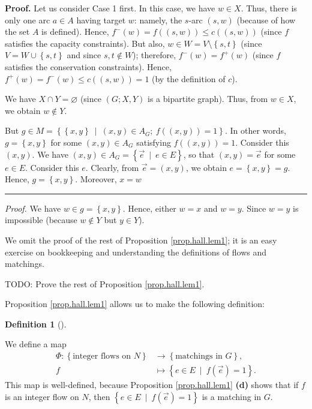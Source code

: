 \documentclass[numbers=enddot,12pt,final,onecolumn,notitlepage]{scrartcl}%
\newcounter{exer}
\theoremstyle{definition}
\newtheorem{defi}[theo]{Definition}
\newenvironment{definition}[1][]
{\begin{defi}[#1]\begin{leftbar}}
{\end{leftbar}\end{defi}}
\newenvironment{proof}[1][Proof]{\noindent\textbf{#1.} }{\ \rule{0.5em}{0.5em}}
\newenvironment{noncompile}{}{}
\begin{document}
\begin{noncompile}
\begin{proof}
Let us consider Case 1 first. In this case, we have $w\in X$. Thus, there is
only one arc $a\in A$ having target $w$: namely, the $s$-arc $\left(
s,w\right)  $ (because of how the set $A$ is defined). Hence, $f^{-}\left(
w\right)  =f\left(  \left(  s,w\right)  \right)  \leq c\left(  \left(
s,w\right)  \right)  $ (since $f$ satisfies the capacity constraints). But
also, $w\in W=V\setminus\left\{  s,t\right\}  $ (since $V=W\cup\left\{
s,t\right\}  $ and since $s,t\notin W$); therefore, $f^{-}\left(  w\right)
=f^{+}\left(  w\right)  $ (since $f$ satisfies the conservation constraints).
Hence, $f^{+}\left(  w\right)  =f^{-}\left(  w\right)  \leq c\left(  \left(
s,w\right)  \right)  =1$ (by the definition of $c$).

We have $X\cap Y=\varnothing$ (since $\left(  G;X,Y\right)  $ is a bipartite
graph). Thus, from $w\in X$, we obtain $w\notin Y$.

But $g\in M=\left\{  \left\{  x,y\right\}  \ \mid\ \left(  x,y\right)  \in
A_{G};\ f\left(  \left(  x,y\right)  \right)  =1\right\}  $. In other words,
$g=\left\{  x,y\right\}  $ for some $\left(  x,y\right)  \in A_{G}$ satisfying
$f\left(  \left(  x,y\right)  \right)  =1$. Consider this $\left(  x,y\right)
$. We have $\left(  x,y\right)  \in A_{G}=\left\{  \overrightarrow{e}%
\ \mid\ e\in E\right\}  $, so that $\left(  x,y\right)  =\overrightarrow{e}$
for some $e\in E$. Consider this $e$. Clearly, from $\overrightarrow{e}%
=\left(  x,y\right)  $, we obtain $e=\left\{  x,y\right\}  =g$. Hence,
$g=\left\{  x,y\right\}  $. Moreover, $x=w$\ \ \ \ 
\end{proof}

\textit{Proof.} We have $w\in g=\left\{  x,y\right\}  $. Hence, either $w=x$
and $w=y$. Since $w=y$ is impossible (because $w\notin Y$ but $y\in Y$).
\end{noncompile}

We omit the proof of the rest of Proposition \ref{prop.hall.lem1}; it is an
easy exercise on bookkeeping and understanding the definitions of flows and matchings.

TODO: Prove the rest of Proposition \ref{prop.hall.lem1}.

Proposition \ref{prop.hall.lem1} allows us to make the following definition:

\begin{definition}
We define a map%
\begin{align*}
\Phi:\left\{  \text{integer flows on }N\right\}   &  \rightarrow\left\{
\text{matchings in }G\right\}  ,\\
f  &  \mapsto\left\{  e\in E\ \mid\ f\left(  \overrightarrow{e}\right)
=1\right\}  .
\end{align*}
This map is well-defined, because Proposition \ref{prop.hall.lem1}
\textbf{(d)} shows that if $f$ is an integer flow on $N$, then $\left\{  e\in
E\ \mid\ f\left(  \overrightarrow{e}\right)  =1\right\}  $ is a matching in
$G$.
\end{definition}
\end{document}
